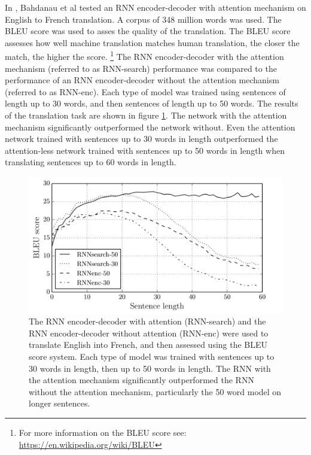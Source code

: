 \documentclass[a4paper,12pt]{article}
\theoremstyle{definition}
\begin{document}
In \cite{bahdanau}, Bahdanau et al tested an RNN encoder-decoder with attention mechanism on English to French translation. A corpus of 348 million words was used. The BLEU score was used to asses the quality of the translation. The BLEU score assesses how well machine translation matches human translation, the closer the match, the higher the score. \footnote{For more information on the BLEU score see: \url{https://en.wikipedia.org/wiki/BLEU}} The RNN encoder-decoder with the attention mechanism (referred to as RNN-search) performance was compared to the performance of an RNN encoder-decoder without the attention mechanism (referred to as RNN-enc). Each type of model was trained using sentences of length up to 30 words, and then sentences of length up to 50 words. The results of the translation task are shown in figure \ref{fig:attention_results}. The network with the attention mechanism significantly outperformed the network without. Even the attention network trained with sentences up to 30 words in length outperformed the attention-less network trained with sentences up to 50 words in length when translating sentences  up to 60 words in length.

\begin{figure}[ht]
	\centering
	\includegraphics[width=\textwidth]{figures/attention_results.png}
	\caption{The RNN encoder-decoder with attention (RNN-search) and the RNN encoder-decoder without attention (RNN-enc) were used to translate English into French, and then assessed using the BLEU score system. Each type of model was trained with sentences up to 30 words in length, then up to 50 words in length. The RNN with the attention mechanism significantly outperformed the RNN without the attention mechanism, particularly the 50 word model on longer sentences.}
	\label{fig:attention_results}
\end{figure}
\end{document}
